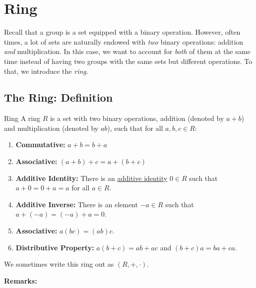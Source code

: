 \documentclass[letterpaper]{article}
\begin{document}
\section{Ring}
Recall that a group is a set equipped with a binary operation. However, often times, a lot of sets are naturally endowed with \emph{two} binary operations: addition \emph{and} multiplication. In this case, we want to account for \emph{both} of them at the same time instead of having two groups with the same sets but different operations. To that, we introduce the \emph{ring}.

\subsection{The Ring: Definition}

\begin{definition}{Ring}{}
    A ring $R$ is a set with two binary operations, addition (denoted by $a + b$) and multiplication (denoted by $ab$), such that for all $a, b, c \in R$:
    \begin{enumerate}
        \item \textbf{Commutative:} $a + b = b + a$
        \item \textbf{Associative:} $(a + b) + c = a + (b + c)$
        \item \textbf{Additive Identity:} There is an \underline{additive identity} $0 \in R$ such that $a + 0 = 0 + a = a$ for all $a \in R$.
        \item \textbf{Additive Inverse:} There is an element $-a \in R$ such that $a + (-a) = (-a) + a = 0$. 
        \item \textbf{Associative:} $a(bc) = (ab)c$. 
        \item \textbf{Distributive Property:} $a(b + c) = ab + ac$ and $(b + c)a = ba + ca$.  
    \end{enumerate}
    We sometimes write this ring out as $(R, +, \cdot)$. 
\end{definition}
\textbf{Remarks:}
\end{document}
